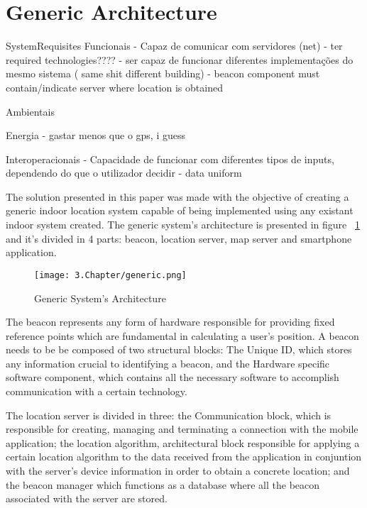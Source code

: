 \section{Generic Architecture}
\label{sec:generic}



SystemRequisites
		Funcionais	
			- Capaz de comunicar com servidores (net)
			- ter required technologies????
			- ser capaz de funcionar diferentes implementações do mesmo sistema ( same shit different building)
			- beacon component must contain/indicate server where location is obtained

		Ambientais
		

		Energia
			- gastar menos que o gps, i guess


		Interoperacionais
			- Capacidade de funcionar com diferentes tipos de inputs, dependendo do que o utilizador decidir
			- data uniform






The solution presented in this paper was made with the objective of creating a generic indoor location system capable of being implemented using any existant indoor system created. The generic system's architecture is presented in figure ~\ref{fig:generic} and it's divided in 4 parts: beacon, location server, map server and smartphone application. 

\begin{figure}
	\centering
		\texttt{[image: 3.Chapter/generic.png]}
	\caption[Generic System's Architecture]{Generic System's Architecture}
	\label{fig:generic}
\end{figure}

The beacon represents any form of hardware responsible for providing fixed reference points which are fundamental in calculating a user's position. A beacon needs to be be composed of two structural blocks: The Unique ID, which stores any information crucial to identifying a beacon, and the Hardware specific software component, which contains all the necessary software to accomplish communication with a certain technology. 

The location server is divided in three: the Communication block, which is responsible for creating, managing and terminating a connection with the mobile application; the location algorithm, architectural block responsible for applying a certain location algorithm to the data received from the application in conjuntion with the server's device information in order to obtain a concrete location; and the beacon manager which functions as a database where all the beacon associated with the server are stored.


